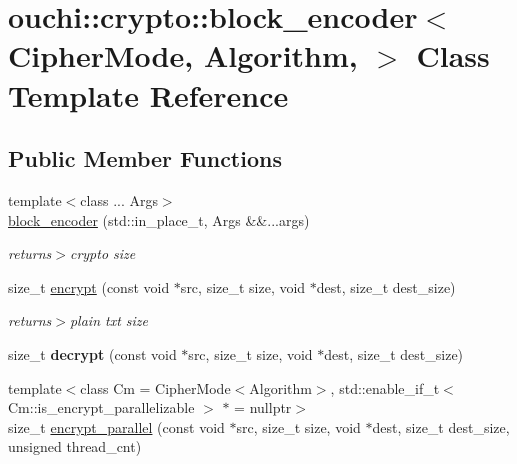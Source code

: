 \hypertarget{classouchi_1_1crypto_1_1block__encoder}{}\section{ouchi\+::crypto\+::block\+\_\+encoder$<$ Cipher\+Mode, Algorithm, $>$ Class Template Reference}
\label{classouchi_1_1crypto_1_1block__encoder}
\subsection*{Public Member Functions}
\begin{DoxyCompactItemize}
\item 
\mbox{\label{classouchi_1_1crypto_1_1block__encoder_a76296319b460fe188134fa707302b530}} 
{\footnotesize template$<$class ... Args$>$ }\\\mbox{\hyperlink{classouchi_1_1crypto_1_1block__encoder_a76296319b460fe188134fa707302b530}{block\+\_\+encoder}} (std\+::in\+\_\+place\+\_\+t, Args \&\&...args)
\begin{DoxyCompactList}\small\item\em returns$>$crypto size\end{DoxyCompactList}\item 
\mbox{\label{classouchi_1_1crypto_1_1block__encoder_ad42b8354e56006a17ea40963dd53dc44}} 
size\+\_\+t \mbox{\hyperlink{classouchi_1_1crypto_1_1block__encoder_ad42b8354e56006a17ea40963dd53dc44}{encrypt}} (const void $\ast$src, size\+\_\+t size, void $\ast$dest, size\+\_\+t dest\+\_\+size)
\begin{DoxyCompactList}\small\item\em returns$>$plain txt size\end{DoxyCompactList}\item 
\mbox{\label{classouchi_1_1crypto_1_1block__encoder_a83c4655202996f1a2cdbf1a4f8d964ed}} 
size\+\_\+t {\bfseries decrypt} (const void $\ast$src, size\+\_\+t size, void $\ast$dest, size\+\_\+t dest\+\_\+size)
\item 
{\footnotesize template$<$class Cm  = Cipher\+Mode$<$\+Algorithm$>$, std\+::enable\+\_\+if\+\_\+t$<$ Cm\+::is\+\_\+encrypt\+\_\+parallelizable $>$ $\ast$  = nullptr$>$ }\\size\+\_\+t \mbox{\hyperlink{classouchi_1_1crypto_1_1block__encoder_a6db3aa2fb1fd0936a66cdb0eeb19387b}{encrypt\+\_\+parallel}} (const void $\ast$src, size\+\_\+t size, void $\ast$dest, size\+\_\+t dest\+\_\+size, unsigned thread\+\_\+cnt)

\end{DoxyCompactItemize}
